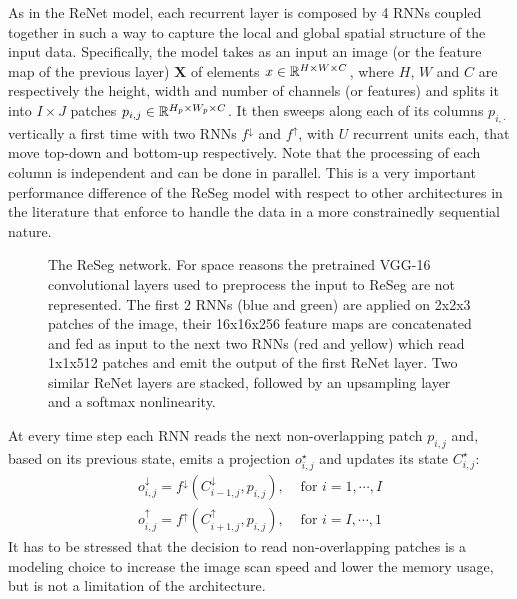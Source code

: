As in the ReNet model, each recurrent layer is composed by 4 RNNs coupled
together in such a way to capture the local and global spatial structure of the
input data. Specifically, the model takes as an input an image (or the feature
map of the previous layer) $\mathbf{X}$ of elements $x \in \mathbb{R}^{H \times W
\times C}$, where $H$, $W$ and $C$ are respectively the height, width and
number of channels (or features) and splits it into $I \times J$ patches
$p_{i,j} \in \mathbb{R}^{H_p \times W_p \times C}$. It then sweeps along each of its
columns $p_{i,\cdot}$ vertically a first time with two RNNs $f^{\downarrow}$
and $f^{\uparrow}$, with $U$ recurrent units each, that move top-down and
bottom-up respectively. Note that the processing of each column is independent
and can be done in parallel. This is a very important performance difference of
the ReSeg model with respect to other architectures in the literature that
enforce to handle the data in a more constrainedly sequential nature.

\begin{figure}[t]
    \advance{}\textwidth
    \centering
    \caption{The ReSeg network. For space reasons the pretrained VGG-16
        convolutional layers used to preprocess the input to ReSeg are
        not represented. The first 2 RNNs (blue and green) are applied on
        2x2x3 patches of the image, their 16x16x256 feature maps are
        concatenated and fed as input to the next two RNNs (red and yellow)
        which read 1x1x512 patches and emit the output of the first ReNet
        layer. Two similar ReNet layers are stacked, followed by an upsampling
        layer and a softmax nonlinearity.}
    \label{fig:ReSeg}
\end{figure}

At every time step each RNN reads the next non-overlapping patch $p_{i,j}$ and,
based on its previous state, emits a projection $o_{i,j}^{\star}$ and updates
its state $C_{i,j}^{\star}$:
\begin{align}
    o^{\downarrow}_{i,j} = f^{\downarrow}(C^{\downarrow}_{i-1,j},p_{i,j}),
        &\text{ for }i=1,\cdots, I\\
    o^{\uparrow}_{i,j} = f^{\uparrow}(C^{\uparrow}_{i+1,j},p_{i,j}),
        &\text{ for }i=I,\cdots,1
\end{align}
It has to be stressed that the decision to read non-overlapping patches is a
modeling choice to increase the image scan speed and lower the memory usage,
but is not a limitation of the architecture.

